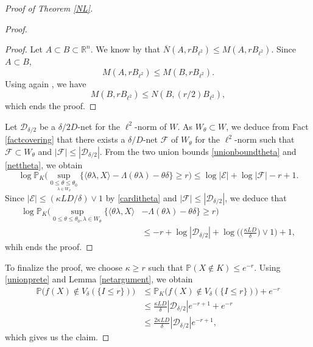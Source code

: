 \documentclass[aop,preprint]{imsart}
\newcommand\RR{\mathbb{R}}
\newcommand\PP{\mathbb{P}}
\numberwithin{equation}{section}
\theoremstyle{definition}
\theoremstyle{plain}
\theoremstyle{remark}
\begin{document}
\begin{proof}[Proof of Theorem \ref{NL}]
\begin{proof}
\begin{proof}
Let $A\subset B\subset \RR^n$. We know by \cite[Fact 4.1.11]{AGM} that $ \overline{N}(A,rB_{\ell^2}) \leq M(A,rB_{\ell^2})$. Since $A\subset B$,
$$ M(A,rB_{\ell^2}) \leq M(B,rB_{\ell^2}).$$
Using again \cite[Fact 4.1.11]{AGM}, we have
$$ M(B,rB_{\ell^2}) \leq N(B,(r/2)B_{\ell^2}),$$
which ends the proof.
\end{proof}
Let $\mathcal{D}_{\delta/2}$ be a $\delta/2D$-net for the $\ell^2$-norm of $W$. As $W_\theta \subset W$, we deduce from Fact \ref{factcovering} that 
 there exists a $\delta/D$-net $\mathcal{F}$ of $W_\theta$ for the $\ell^2$-norm such that $\mathcal{F} \subset W_\theta$ and $|\mathcal{F}|\leq |\mathcal{D}_{\delta/2}|$. From the two union bounds \eqref{unionboundtheta} and \eqref{nettheta}, we obtain
$$ \log \PP_K \big( \sup_{ \underset{\lambda \in  W_{\theta}}{0 \leq \theta \leq \theta_0}} \{ \langle \theta \lambda , X\rangle - \Lambda(\theta\lambda) - \theta \delta\} \geq r\big)\leq \log |\mathcal{E}| + \log |\mathcal{F}| -r+1.$$
Since $|\mathcal{E}|\leq (\kappa LD/\delta)\vee 1$ by \eqref{carditheta} and $|\mathcal{F} |\leq |\mathcal{D}_{\delta/2}|$, we deduce that
\begin{align*} \log \PP_K \big( \sup_{0 \leq \theta \leq \theta_0, \lambda \in  W_{\theta}} \{ \langle \theta \lambda , X\rangle &- \Lambda(\theta\lambda) - \theta \delta\} \geq r\big)\\
&\leq -r+\log |\mathcal{D}_{\delta/2}| + \log \Big(\Big(\frac{\kappa LD}{\delta}\Big)\vee 1\Big) + 1,\end{align*}
whih ends the proof.
\end{proof}
To finalize the proof, we choose $\kappa \geq r$ such that $\PP( X \notin K) \leq e^{-r}$. Using \eqref{unionprete}  and Lemma \ref{netargument}, we obtain
 \begin{align*}\PP\big( f(X) \notin V_{\delta}(\{I\leq r\}) \big)&\leq  \PP_K\big( f(X) \notin V_{\delta}(\{I\leq r\}) \big) +e^{-r}\\
& \leq \frac{\kappa LD}{\delta}|\mathcal{D}_{\delta/2}| e^{-r+1}+e^{-r}\\
& \leq \frac{2\kappa LD}{\delta}|\mathcal{D}_{\delta/2}| e^{-r+1},
\end{align*}
which gives us the claim.

\end{proof}
\end{document}
